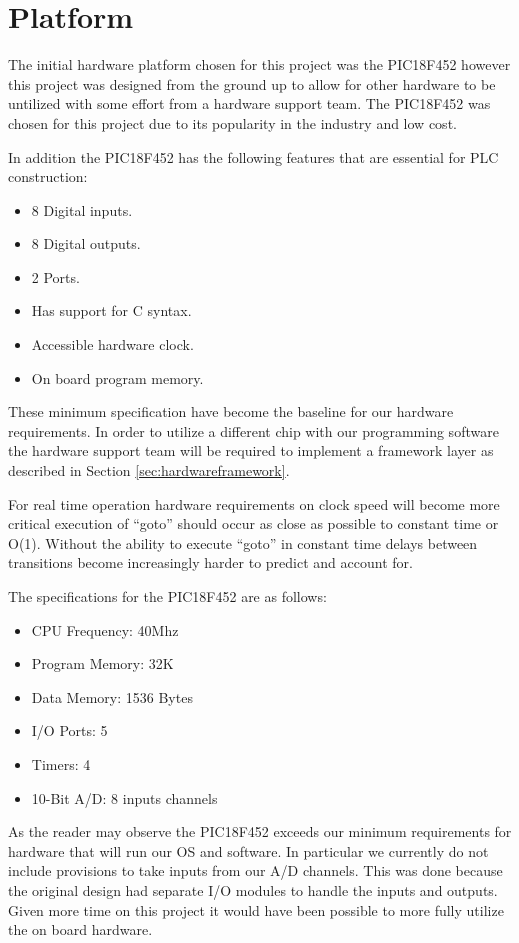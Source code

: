 \section{Platform}
\label{sec:hardwareplatform}

The initial hardware platform chosen for this project was the PIC18F452 
however this project was designed from the ground up to allow for other 
hardware to be untilized with some effort from a hardware support team. 
The PIC18F452 was chosen for this project due to its popularity in 
the industry and low cost.

In addition the PIC18F452 has the following features that are essential 
for PLC construction:

\begin{itemize}
\item 8 Digital inputs.
\item 8 Digital outputs.
\item 2 Ports.
\item Has support for C syntax.
\item Accessible hardware clock.
\item On board program memory.
\end{itemize}

These minimum specification have become the baseline for our hardware 
requirements. In order to utilize a different chip with our programming 
software the hardware support team will be required to implement a framework 
layer as described in Section \ref{sec:hardwareframework}.

For real time operation hardware requirements on clock speed will 
become more critical execution of ``goto'' should occur as close as
 possible to constant time or O(1). Without the ability to execute 
 ``goto'' in constant time delays between transitions become 
 increasingly harder to predict and account for.

The specifications for the PIC18F452 are as follows:
\begin{itemize}
	\item CPU Frequency: 40Mhz
	\item Program Memory: 32K
	\item Data Memory: 1536 Bytes
	\item I/O Ports: 5
	\item Timers: 4
	\item 10-Bit A/D: 8 inputs channels
\end{itemize}

As the reader may observe the PIC18F452 exceeds our minimum 
requirements for hardware that will run our OS and software. In 
particular we currently do not include provisions to take inputs 
from our A/D channels. This was done because the original design had 
separate I/O modules to handle the inputs and outputs. Given more 
time on this project it would have been possible to more fully utilize 
the on board hardware.
